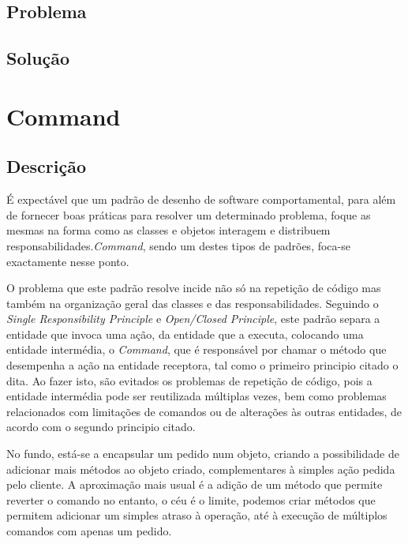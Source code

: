 \documentclass[10pt,portuguese]{article}
\begin{document}
\par 

\par 
\subsection{Problema}
\subsection{Solução}

\clearpage

\section{Command}
\subsection{Descrição}

\par É expectável que um padrão de desenho de software comportamental, para além de fornecer boas práticas para resolver um determinado problema, foque as mesmas na forma como as classes e objetos interagem e distribuem responsabilidades.\textit{Command}, sendo um destes tipos de padrões, foca-se exactamente nesse ponto.

\par O problema que este padrão resolve incide não só na repetição de código mas também na organização geral das classes e das responsabilidades. Seguindo o \textit{Single Responsibility Principle} e \textit{Open/Closed Principle}, este padrão separa a entidade que invoca uma ação, da entidade que a executa, colocando uma entidade intermédia, o \textit{Command}, que é responsável por chamar o método que desempenha a ação na entidade receptora, tal como o primeiro principio citado o dita.
Ao fazer isto, são evitados os problemas de repetição de código, pois a entidade intermédia pode ser reutilizada múltiplas vezes, bem como problemas relacionados com limitações de comandos ou de alterações às outras entidades, de acordo com o segundo principio citado.

\par No fundo, está-se a encapsular um pedido num objeto, criando a possibilidade de adicionar mais métodos ao objeto criado, complementares à simples ação pedida pelo cliente.
A aproximação mais usual é a adição de um método que permite reverter o comando no entanto, o céu é o limite, podemos criar métodos que permitem adicionar um simples atraso à operação, até à execução de múltiplos comandos com apenas um pedido.
\end{document}
